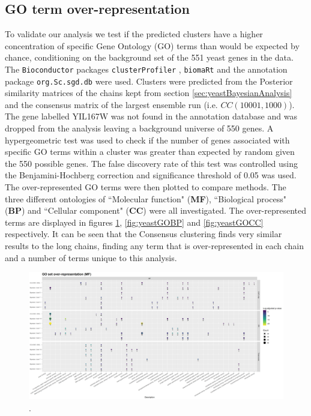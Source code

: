 \documentclass[]{article}
\begin{document}
\subsection{GO term over-representation} \label{sec:goTermOverRep}
To validate our analysis we test if the predicted clusters have a higher concentration of specific  Gene Ontology (GO) terms than would be expected by chance, conditioning on the background set of the 551 yeast genes in the data. The \texttt{Bioconductor} packages \texttt{clusterProfiler} \citep{yu2012clusterProfiler}, \texttt{biomaRt} \citep{durinck2009mapping} and the annotation package \texttt{org.Sc.sgd.db} \citep{carlson2014org} were used. Clusters were predicted from the Posterior similarity matrices of the chains kept from section \ref{sec:yeastBayesianAnalysis} and the consensus matrix of the largest ensemble run (i.e. $CC(10001, 1000)$). The gene labelled YIL167W was not found in the annotation database and was dropped from the analysis leaving a background universe of 550 genes. A hypergeometric test was used to check if the number of genes associated with specific GO terms within a cluster was greater than expected by random given the 550 possible genes. The false discovery rate of this test was controlled using the Benjamini-Hochberg correction \citep{benjamini1995controlling} and significance threshold of 0.05 was used. The over-represented GO terms were then plotted to compare methods. The three different ontologies of ``Molecular function" (\textbf{MF}), ``Biological process" (\textbf{BP}) and ``Cellular component" (\textbf{CC}) were all investigated. The over-represented terms are displayed in figures \ref{fig:yeastGOMF}, \ref{fig:yeastGOBP} and \ref{fig:yeastGOCC} respectively. It can be seen that the Consensus clustering finds very similar results to the long chains, finding any term that is over-represented in each chain and a number of terms unique to this analysis.

\begin{figure}
	\centering
	\includegraphics[scale=0.4]{./Images/Yeast/goEnrichmentCompMF.png}
	\caption{.}
	\label{fig:yeastGOMF}
\end{figure}
\end{document}

